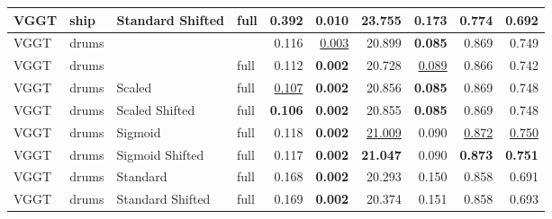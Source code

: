 \begin{table}[H]
\begin{tabular}{llllrrrrrr}
VGGT & ship & Standard Shifted & full & 0.392 & 0.010 & \textbf{23.755} & 0.173 & \textbf{0.774} & 0.692 \\
\midrule
VGGT & drums &  &  & 0.116 & \underline{0.003} & 20.899 & \textbf{0.085} & 0.869 & 0.749 \\
VGGT & drums &  & full & 0.112 & \textbf{0.002} & 20.728 & \underline{0.089} & 0.866 & 0.742 \\
VGGT & drums & Scaled & full & \underline{0.107} & \textbf{0.002} & 20.856 & \textbf{0.085} & 0.869 & 0.748 \\
VGGT & drums & Scaled Shifted & full & \textbf{0.106} & \textbf{0.002} & 20.855 & \textbf{0.085} & 0.869 & 0.748 \\
VGGT & drums & Sigmoid & full & 0.118 & \textbf{0.002} & \underline{21.009} & 0.090 & \underline{0.872} & \underline{0.750} \\
VGGT & drums & Sigmoid Shifted & full & 0.117 & \textbf{0.002} & \textbf{21.047} & 0.090 & \textbf{0.873} & \textbf{0.751} \\
VGGT & drums & Standard & full & 0.168 & \textbf{0.002} & 20.293 & 0.150 & 0.858 & 0.691 \\
VGGT & drums & Standard Shifted & full & 0.169 & \textbf{0.002} & 20.374 & 0.151 & 0.858 & 0.693 \\
\bottomrule
\end{tabular}
\end{table}